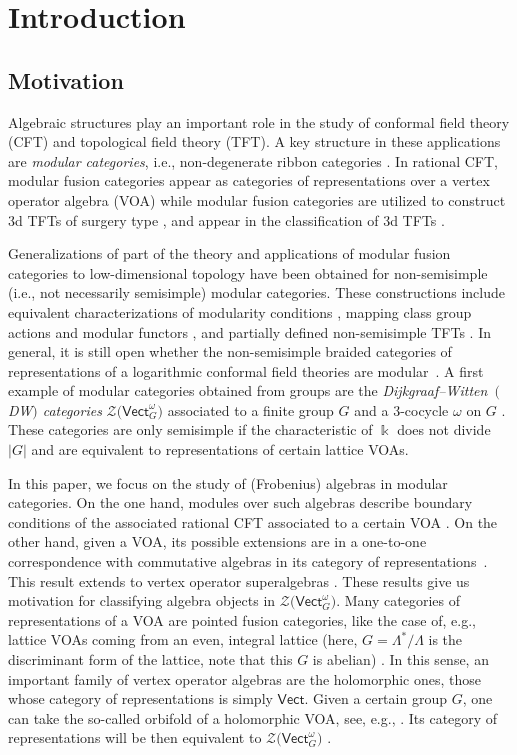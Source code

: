 \documentclass[pdftex]{sigma}
\numberwithin{equation}{section}
\newcommand{\Vect}{\mathsf{Vect}}
\newcommand{\cZ}{\mathcal{Z}}
\begin{document}

\section{Introduction}%

\subsection{Motivation}

Algebraic structures play an important role in the study of conformal field theory (CFT) and topological field theory (TFT). A key structure in these applications are \emph{modular categories}, i.e., non-degenerate ribbon categories \cite{KL,Shi1}. In rational CFT, modular fusion categories appear as categories of representations over a vertex operator algebra (VOA) \cite{Hua} while modular fusion categories are utilized to construct 3d TFTs of surgery type \cite{RT91,Tur}, and appear in the classification of 3d TFTs \cite{BDSV}.

Generalizations of part of the theory and applications of modular fusion categories to low-dimensional topology have been obtained for non-semisimple (i.e., not necessarily semisimple) modular categories. These constructions include equivalent characterizations of modularity conditions \cite{Shi1}, mapping class group actions and modular functors \cite{FSS,LMSS,SW}, and partially defined non-semisimple TFTs \cite{DGGPR, KL}.
In general, it is still open whether the non-semisimple braided categories of representations of a logarithmic conformal field theories are modular~\cite{HLZ, Len}. A first example of modular categories obtained from groups are the \emph{Dijkgraaf--Witten~$($DW$)$ categories} $\cZ\big(\Vect_G^\omega\big)$ associated to a finite group $G$ and a $3$-cocycle $\omega$ on $G$ \cite{DPR}. These categories are only semisimple if the characteristic of $\Bbbk$ does not divide $|G|$ and are equivalent to representations of certain lattice VOAs.


In this paper, we focus on the study of (Frobenius) algebras in modular categories. On the one hand, modules over such algebras describe boundary conditions of the associated rational CFT associated to a certain VOA \cite{FFRS,FRS}. On the other hand, given a VOA, its possible extensions are in a one-to-one correspondence with commutative algebras in its category of representations~\cite{HKL}. This result extends to vertex operator superalgebras \cite{CKM}. These results give us motivation for classifying algebra objects in $\cZ\big(\Vect_G^\omega\big)$. Many categories of representations of a VOA are pointed fusion categories, like the case of, e.g., lattice VOAs coming from an even, integral lattice (here, $G=\Lambda^*/\Lambda$ is the discriminant form of the lattice, note that this $G$ is abelian) \cite{DL,Len}. In this sense, an important family of vertex operator algebras are the holomorphic ones, those whose category of representations is simply $\Vect$. Given a certain group $G$, one can take the so-called orbifold of a holomorphic VOA, see, e.g., \cite{DongRenXu, Moeller}. Its category of representations will be then equivalent to $\cZ\big(\Vect_G^\omega\big)$ \cite{McRae}.
\end{document}
